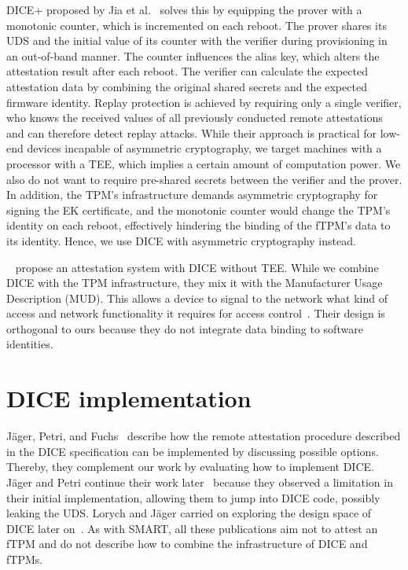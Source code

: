 DICE+ proposed by Jia et al.~\cite{Jia2020} solves this by equipping the prover with a monotonic counter, which is incremented on each reboot.
The prover shares its UDS and the initial value of its counter with the verifier during provisioning in an out-of-band manner.
The counter influences the alias key, which alters the attestation result after each reboot.
The verifier can calculate the expected attestation data by combining the original shared secrets and the expected firmware identity.
Replay protection is achieved by requiring only a single verifier, who knows the received values of all previously conducted remote attestations and can therefore detect replay attacks.
While their approach is practical for low-end devices incapable of asymmetric cryptography, we target machines with a processor with a \ac{TEE}, which implies a certain amount of computation power.
We also do not want to require pre-shared secrets between the verifier and the prover.
In addition, the TPM's infrastructure demands asymmetric cryptography for signing the EK certificate, and the monotonic counter would change the TPM's identity on each reboot, effectively hindering the binding of the fTPM's data to its identity.
Hence, we use DICE with asymmetric cryptography instead.

~\cite{Bravi2023} propose an attestation system with DICE without TEE\@.
While we combine DICE with the TPM infrastructure, they mix it with the Manufacturer Usage Description (MUD).
This allows a device to signal to the network what kind of access and network functionality it requires for access control~\cite{Lear2019}.
Their design is orthogonal to ours because they do not integrate data binding to software identities.

\section{DICE implementation}

Jäger, Petri, and Fuchs~\cite{Jaeger2017} describe how the remote attestation procedure described in the DICE specification can be implemented by discussing possible options.
Thereby, they complement our work by evaluating how to implement \ac{DICE}\@.
Jäger and Petri continue their work later~\cite{Jaeger2020} because they observed a limitation in their initial implementation, allowing them to jump into \ac{DICE} code, possibly leaking the \ac{UDS}.
Lorych and Jäger carried on exploring the design space of DICE later on~\cite{Lorych2022}.
As with SMART, all these publications aim not to attest an \ac{fTPM} and do not describe how to combine the infrastructure of DICE and \acp{fTPM}.


